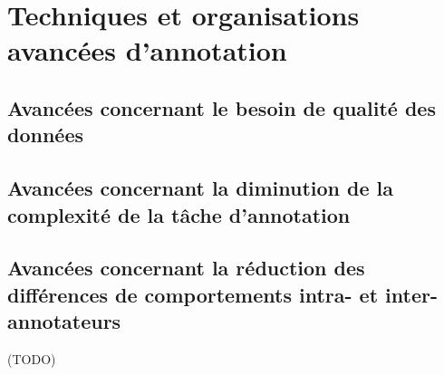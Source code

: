     \section{Techniques et organisations avancées d'annotation}
	\label{section:2.4-AVANCEES-ANNOTATION}
		
		
		\subsection{Avancées concernant le besoin de qualité des données}
		\label{section:2.4.1-AVANCEES-ANNOTATION-ASPECT-DONNEES}
		
		
		\subsection{Avancées concernant la diminution de la complexité de la tâche d'annotation}
		\label{section:2.4.2-AVANCEES-ANNOTATION-ASPECT-COMPLEXITE}
		
		
		\subsection{Avancées concernant la réduction des différences de comportements intra- et inter-annotateurs}
		\label{section:2.4.3-AVANCEES-ANNOTATION-ASPECT-HUMAIN}
		
		
		\begin{leftBarSummary}
			\begin{todolist}
				\item[\itemok] (TODO)
			\end{todolist}
		\end{leftBarSummary}

